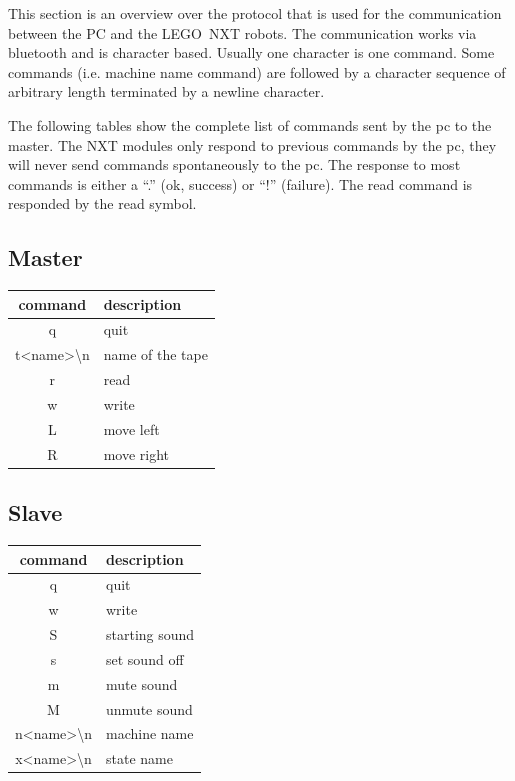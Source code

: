 \documentclass[%
  a4paper,%
  11pt,%
  blue,%
  hyperref	%
  ]{tubsartcl}
\begin{document}
This section is an overview over the protocol that is used for the communication between the PC and the LEGO\textregistered\, NXT robots. The communication works via bluetooth and is character based. Usually one character is one command. Some commands (i.e. machine name command) are followed by a character sequence of arbitrary length terminated by a newline character.

The following tables show the complete list of commands sent by the pc to the master. The NXT modules only respond to previous commands by the pc, they will never send commands spontaneously to the pc. The response to most commands is either a ``.'' (ok, success) or ``!'' (failure). The read command is responded by the read symbol.

\begin{minipage}{5cm}
\subsection{Master}
\begin{tabular}{c|l}
command & description\\
\hline
q & quit\\
t<name>\textbackslash n & name of the tape\\
r & read\\
w & write\\
L & move left\\
R & move right
\end{tabular}
\vspace{1cm}
\end{minipage}
\hspace{2cm}
\begin{minipage}{5cm}
\subsection{Slave}
\begin{tabular}{c|l}
command & description\\
\hline
q & quit\\
w & write\\
S & starting sound\\
s & set sound off\\
m & mute sound\\
M & unmute sound\\
n<name>\textbackslash n & machine name\\
x<name>\textbackslash n & state name
\end{tabular}
\end{minipage}
\end{document}
